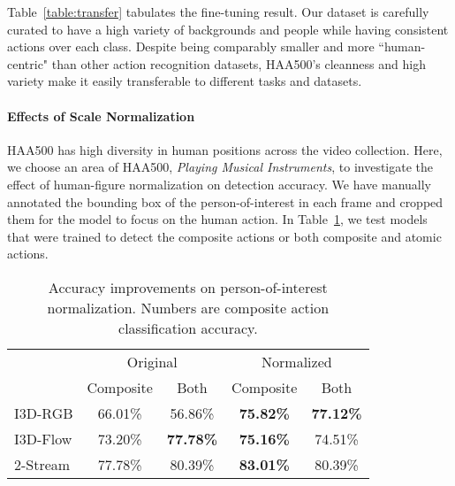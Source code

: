 \documentclass[10pt,twocolumn,letterpaper]{article}
\begin{document}
Table~\ref{table:transfer} tabulates the fine-tuning result.
Our dataset is carefully curated to have a high variety of backgrounds and people while having consistent actions over each class. Despite being comparably smaller and more ``human-centric" than other action recognition datasets, HAA500's cleanness and high variety make it easily transferable to different tasks and datasets.

\vspace{-1em}
\paragraph{Effects of Scale Normalization} 

HAA500 has high diversity in human positions across the video collection. Here, we choose an area of HAA500, \textit{Playing Musical Instruments}, to investigate the effect of human-figure normalization on detection accuracy. We have manually annotated the bounding box of the person-of-interest in each frame and cropped them for the model to focus on the human action. In Table~\ref{table:normalize}, we test models that were trained to detect the composite actions or both composite and atomic actions. 

\begin{table}[t]
    {\small 
    \begin{center}
        \begin{tabular}{ l |c |c | c | c  }
        \hline
          & \multicolumn{2}{c|}{Original} & \multicolumn{2}{c}{Normalized} \\
          & Composite  & Both & Composite  & Both  \\
        \hline
        I3D-RGB  & 66.01\%  & 56.86\%          & \textbf{75.82\%} & \textbf{77.12\%} \\ 
        I3D-Flow & 73.20\%  & \textbf{77.78\%} & \textbf{75.16\%} & 74.51\% \\ 
        2-Stream & 77.78\%  & 80.39\%          & \textbf{83.01\%} & 80.39\% \\ 
        \hline
        \end{tabular}
    \end{center}}
    \vspace{-0.1in}
    \caption{Accuracy improvements on person-of-interest normalization. Numbers are composite action classification accuracy.}
    \label{table:normalize}
    \vspace{-0.2in}
\end{table}
\end{document}
